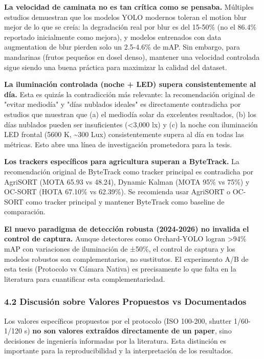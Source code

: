 \textbf{La velocidad de caminata no es tan crítica como se pensaba.} Múltiples estudios demuestran que los modelos YOLO modernos toleran el motion blur mejor de lo que se creía: la degradación real por blur es del 15-50\% (no el 86.4\% reportado inicialmente como mejora), y modelos entrenados con data augmentation de blur pierden solo un 2.5-4.6\% de mAP. Sin embargo, para mandarinas (frutos pequeños en dosel denso), mantener una velocidad controlada sigue siendo una buena práctica para maximizar la calidad del dataset.


\textbf{La iluminación controlada (noche + LED) supera consistentemente al día.} Esta es quizás la contradicción más relevante: la recomendación original de "evitar mediodía" y "días nublados ideales" es directamente contradicha por estudios que muestran que (a) el mediodía solar da excelentes resultados, (b) los días nublados pueden ser insuficientes (<3,000 lx) y (c) la noche con iluminación LED frontal (5600 K, \textasciitilde{}300 Lux) consistentemente supera al día en todas las métricas. Esto abre una línea de investigación prometedora para la tesis.


\textbf{Los trackers específicos para agricultura superan a ByteTrack.} La recomendación original de ByteTrack como tracker principal es contradicha por AgriSORT (MOTA 65.93 vs 48.24), Dynamic Kalman (MOTA 95\% vs 75\%) y OC-SORT (HOTA 67.10\% vs 62.39\%). Se recomienda usar AgriSORT o OC-SORT como tracker principal y mantener ByteTrack como baseline de comparación.


\textbf{El nuevo paradigma de detección robusta (2024-2026) no invalida el control de captura.} Aunque detectores como Orchard-YOLO logran >94\% mAP con variaciones de iluminación de ±50\%, el control de captura y los modelos robustos son complementarios, no sustitutos. El experimento A/B de esta tesis (Protocolo vs Cámara Nativa) es precisamente lo que falta en la literatura para cuantificar esta complementariedad.


\subsubsection{4.2 Discusión sobre Valores Propuestos vs Documentados}


Los valores específicos propuestos por el protocolo (ISO 100-200, shutter 1/60-1/120 s) \textbf{no son valores extraídos directamente de un paper}, sino decisiones de ingeniería informadas por la literatura. Esta distinción es importante para la reproducibilidad y la interpretación de los resultados.


